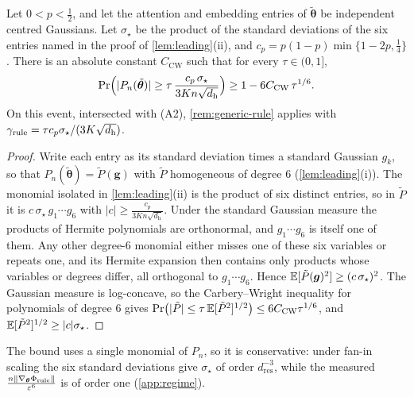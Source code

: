 \begin{proposition}
\label{prop:anticoncentration}
Let $0<p<\frac12$, and let the attention and embedding entries of $\tilde{\bm\theta}$ be independent centred Gaussians. Let $\sigma_\star$ be the product of the standard deviations
of the six entries named in the proof of \cref{lem:leading}(ii), and $c_p=p(1-p)\min\{1-2p,\frac14\}$. There is an absolute constant $C_{\mathrm{CW}}$ such that for every $\tau\in(0,1]$,
\[
 \Pr\Bigl(|P_n(\tilde{\bm\theta})|\ge\tau\,\frac{c_p\,\sigma_\star}{3Kn\sqrt{d_{\mathrm h}}}\Bigr)\ge1-6C_{\mathrm{CW}}\,\tau^{1/6}.
\]
On this event, intersected with (A2), \cref{rem:generic-rule} applies with $\gamma_{\mathrm{rule}}=\tau c_p\sigma_\star/(3K\sqrt{d_{\mathrm h}})$.
\end{proposition}
\begin{proof}
Write each entry as its standard deviation times a standard Gaussian $g_k$, so that $P_n(\tilde{\bm\theta})=\tilde P(\bm g)$ with $\tilde P$ homogeneous of degree $6$ (\cref{lem:leading}(i)).
The monomial isolated in \cref{lem:leading}(ii) is the product of six distinct entries, so in $\tilde P$ it is $c\,\sigma_\star\,g_1\cdots g_6$ with
$|c|\ge\frac{c_p}{3Kn\sqrt{d_{\mathrm h}}}$. Under the standard Gaussian measure the products of Hermite polynomials are orthonormal, and $g_1\cdots g_6$ is itself one of them.
Any other degree-$6$ monomial either misses one of these six variables or repeats one, and its Hermite expansion then contains only products whose
variables or degrees differ, all orthogonal to $g_1\cdots g_6$. Hence $\mathbb E[\tilde P(\bm g)^2]\ge(c\,\sigma_\star)^2$. The Gaussian measure is log-concave, so the
Carbery--Wright inequality \citep{carbery2001distributional} for polynomials of degree $6$ gives
$\Pr\bigl(|\tilde P|\le\tau\,\mathbb E[\tilde P^2]^{1/2}\bigr)\le6C_{\mathrm{CW}}\tau^{1/6}$, and $\mathbb E[\tilde P^2]^{1/2}\ge|c|\sigma_\star$.
\end{proof}
The bound uses a single monomial of $P_n$, so it is conservative: under fan-in scaling the six standard deviations give $\sigma_\star$ of order $d_{\mathrm{res}}^{-3}$,
while the measured $\frac{n\|\nabla_{\bm\theta}\Phi_{\mathrm{rule}}\|}{\varepsilon^6}$ is of order one (\cref{app:regime}).

